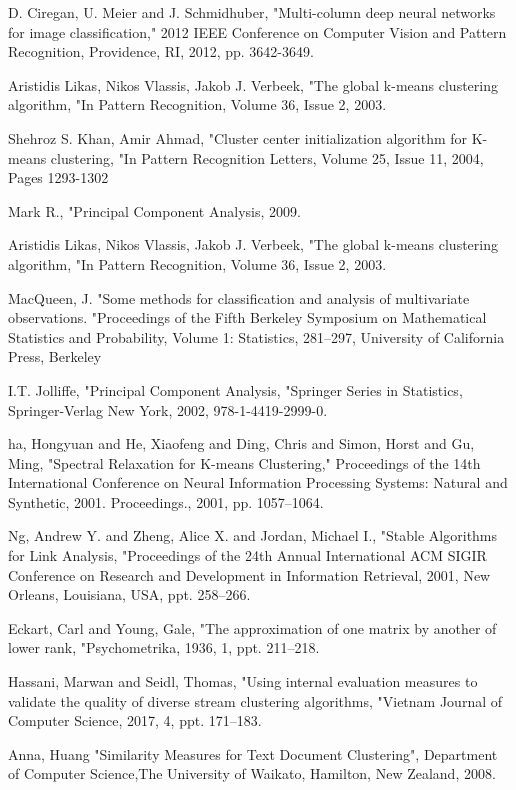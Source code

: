 \documentclass[conference]{IEEEtran}
\begin{document}
\begin{thebibliography}{00}
 D. Ciregan, U. Meier and J. Schmidhuber, "Multi-column deep neural networks for image classification," 2012 IEEE Conference on Computer Vision and Pattern Recognition, Providence, RI, 2012, pp. 3642-3649.

 Aristidis Likas, Nikos Vlassis, Jakob J. Verbeek, "The global k-means clustering algorithm, "In Pattern Recognition, Volume 36, Issue 2, 2003.

 Shehroz S. Khan, Amir Ahmad, "Cluster center initialization algorithm for K-means clustering, "In Pattern Recognition Letters, Volume 25, Issue 11, 2004, Pages 1293-1302

 Mark R., "Principal Component Analysis, 2009.

 Aristidis Likas, Nikos Vlassis, Jakob J. Verbeek, "The global k-means clustering algorithm, "In Pattern Recognition, Volume 36, Issue 2, 2003.

 MacQueen, J. "Some methods for classification and analysis of multivariate observations. "Proceedings of the Fifth Berkeley Symposium on Mathematical Statistics and Probability, Volume 1: Statistics,
281--297, University of California Press, Berkeley

 I.T. Jolliffe, "Principal Component Analysis, "Springer Series in Statistics, Springer-Verlag New York, 2002, 978-1-4419-2999-0.

 ha, Hongyuan and He, Xiaofeng and Ding, Chris and Simon, Horst and Gu, Ming, "Spectral Relaxation for K-means Clustering," Proceedings of the 14th International Conference on Neural Information Processing Systems: Natural and Synthetic, 2001. Proceedings., 2001, pp. 1057--1064.

 Ng, Andrew Y. and Zheng, Alice X. and Jordan, Michael I., "Stable Algorithms for Link Analysis, "Proceedings of the 24th Annual International ACM SIGIR Conference on Research and Development in Information Retrieval, 2001, New Orleans, Louisiana, USA, ppt. 258--266.

 Eckart, Carl
and Young, Gale, "The approximation of one matrix by another of lower rank, "Psychometrika, 1936, 1, ppt. 211--218.

 Hassani, Marwan
and Seidl, Thomas, "Using internal evaluation measures to validate the quality of diverse stream clustering algorithms, "Vietnam Journal of Computer Science, 2017, 4, ppt. 171--183.

 Anna, Huang
"Similarity Measures for Text Document Clustering", Department of Computer Science,The University of Waikato, Hamilton, New Zealand, 2008.


\end{thebibliography}
\end{document}
